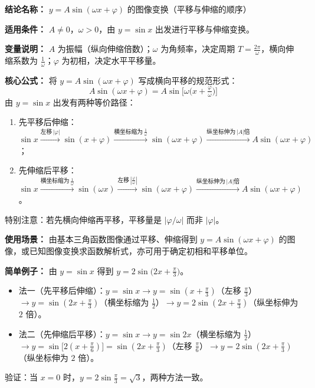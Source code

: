 \textbf{结论名称：} $y=A\sin(\omega x+\varphi)$ 的图像变换（平移与伸缩的顺序）

\textbf{适用条件：} $A\neq0$，$\omega>0$，由 $y=\sin x$ 出发进行平移与伸缩变换。

\textbf{变量说明：} $A$ 为振幅（纵向伸缩倍数）；$\omega$ 为角频率，决定周期 $T=\frac{2\pi}{\omega}$，横向伸缩系数为 $\frac{1}{\omega}$；$\varphi$ 为初相，决定水平平移量。

\textbf{核心公式：}
将 $y=A\sin(\omega x+\varphi)$ 写成横向平移的规范形式：
\[
\boxed{A\sin(\omega x+\varphi)=A\sin\!\big[\omega\big(x+\tfrac{\varphi}{\omega}\big)\big]}
\]
由 $y=\sin x$ 出发有两种等价路径：
\begin{enumerate}
\item 先平移后伸缩：$\sin x \xrightarrow{\text{左移}\,|\varphi|} \sin(x+\varphi) \xrightarrow{\text{横坐标缩为}\,\frac{1}{\omega}} \sin(\omega x+\varphi) \xrightarrow{\text{纵坐标伸为}\,|A|\text{倍}} A\sin(\omega x+\varphi)$；
\item 先伸缩后平移：$\sin x \xrightarrow{\text{横坐标缩为}\,\frac{1}{\omega}} \sin(\omega x) \xrightarrow{\text{左移}\,\left|\frac{\varphi}{\omega}\right|} \sin(\omega x+\varphi) \xrightarrow{\text{纵坐标伸为}\,|A|\text{倍}} A\sin(\omega x+\varphi)$。
\end{enumerate}
特别注意：若先横向伸缩再平移，平移量是 $|\varphi/\omega|$ 而非 $|\varphi|$。

\textbf{使用场景：} 由基本三角函数图像通过平移、伸缩得到 $y=A\sin(\omega x+\varphi)$ 的图像，或已知图像变换求函数解析式，亦可用于确定初相和平移单位。

\textbf{简单例子：} 由 $y=\sin x$ 得到 $y=2\sin\!\big(2x+\frac{\pi}{3}\big)$。
\begin{itemize}
\item 法一（先平移后伸缩）：$y=\sin x \to y=\sin(x+\frac{\pi}{3})$（左移 $\frac{\pi}{3}$）$\to y=\sin(2x+\frac{\pi}{3})$（横坐标缩为 $\frac{1}{2}$）$\to y=2\sin(2x+\frac{\pi}{3})$（纵坐标伸为 $2$ 倍）。
\item 法二（先伸缩后平移）：$y=\sin x \to y=\sin 2x$（横坐标缩为 $\frac{1}{2}$）$\to y=\sin\bigl[2(x+\frac{\pi}{6})\bigr]=\sin(2x+\frac{\pi}{3})$（左移 $\frac{\pi}{6}$）$\to y=2\sin(2x+\frac{\pi}{3})$（纵坐标伸为 $2$ 倍）。
\end{itemize}
验证：当 $x=0$ 时，$y=2\sin\frac{\pi}{3}=\sqrt{3}$，两种方法一致。